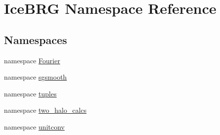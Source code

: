 \hypertarget{namespaceIceBRG}{\section{Ice\-B\-R\-G Namespace Reference}
\label{namespaceIceBRG}
}
\subsection*{Namespaces}
\begin{DoxyCompactItemize}
\item 
namespace \hyperlink{namespaceIceBRG_1_1Fourier}{Fourier}
\item 
namespace \hyperlink{namespaceIceBRG_1_1sgsmooth}{sgsmooth}
\item 
namespace \hyperlink{namespaceIceBRG_1_1tuples}{tuples}
\item 
namespace \hyperlink{namespaceIceBRG_1_1two__halo__calcs}{two\-\_\-halo\-\_\-calcs}
\item 
namespace \hyperlink{namespaceIceBRG_1_1unitconv}{unitconv}
\end{DoxyCompactItemize}
